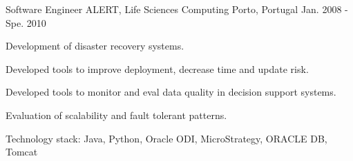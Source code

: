 \begin{cventries}
  \cventry
    {Software Engineer} %
    {ALERT, Life Sciences Computing} %
    {Porto, Portugal} %
    {Jan. 2008 - Spe. 2010} %
    {
      \begin{cvitems} %
        \item {Development of disaster recovery systems.}
        \item {Developed tools to improve deployment, decrease time and update risk.}
        \item {Developed tools to monitor and eval data quality in decision support systems.}
        \item {Evaluation of scalability and fault tolerant patterns.}
        \item {Technology stack: Java, Python, Oracle ODI, MicroStrategy, ORACLE DB, Tomcat}
      \end{cvitems}
    }

\end{cventries}
